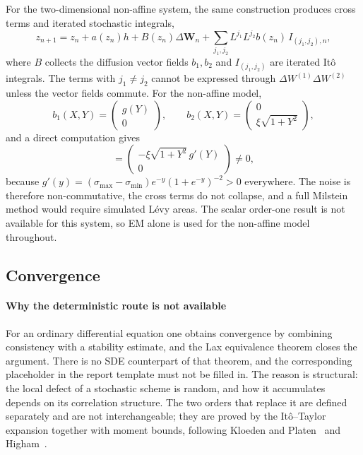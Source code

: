 \documentclass[11pt,a4paper]{article}
\theoremstyle{definition}
\theoremstyle{remark}
\begin{document}
For the two-dimensional non-affine system, the same construction produces cross terms and iterated stochastic integrals,
\begin{equation}
    z_{n+1} = z_n + a(z_n) h + B(z_n) \Delta \bm{W}_n + \sum_{j_1, j_2} L^{j_1} L^{j_2} b(z_n)\, I_{(j_1, j_2), n},
    \label{eq:milstein-multi}
\end{equation}
where $B$ collects the diffusion vector fields $b_1, b_2$ and $I_{(j_1,j_2)}$ are iterated It\^o integrals. The terms with $j_1 \ne j_2$ cannot be expressed through $\Delta W^{(1)} \Delta W^{(2)}$ unless the vector fields commute. For the non-affine model,
\begin{equation}
    b_1(X, Y) = \begin{pmatrix} g(Y) \\ 0 \end{pmatrix},
    \qquad
    b_2(X, Y) = \begin{pmatrix} 0 \\ \xi \sqrt{1 + Y^2} \end{pmatrix},
    \label{eq:vector-fields}
\end{equation}
and a direct computation gives
\begin{equation}
    [b_1, b_2] = \begin{pmatrix} -\xi \sqrt{1 + Y^2}\, g'(Y) \\ 0 \end{pmatrix} \ne 0,
    \label{eq:lie-bracket}
\end{equation}
because $g'(y) = (\sigma_{\max} - \sigma_{\min}) e^{-y} (1 + e^{-y})^{-2} > 0$ everywhere. The noise is therefore non-commutative, the cross terms do not collapse, and a full Milstein method would require simulated L\'evy areas. The scalar order-one result is not available for this system, so EM alone is used for the non-affine model throughout.

\subsection{Convergence}
\label{sec:convergence}

\paragraph{Why the deterministic route is not available}
For an ordinary differential equation one obtains convergence by combining consistency with a stability estimate, and the Lax equivalence theorem closes the argument. There is no SDE counterpart of that theorem, and the corresponding placeholder in the report template must not be filled in. The reason is structural: the local defect of a stochastic scheme is random, and how it accumulates depends on its correlation structure. The two orders that replace it are defined separately and are not interchangeable; they are proved by the It\^o--Taylor expansion together with moment bounds, following Kloeden and Platen~\cite{kloeden} and Higham~\cite{higham}.
\end{document}
